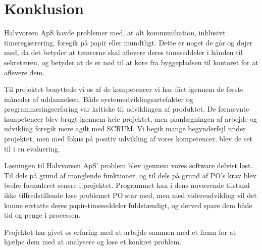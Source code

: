 \section{Konklusion}
Halvvorsen ApS havde problemer med, at alt kommunikation, inklusivt timeregistrering, foregik på papir eller mundtligt. 
Dette er noget de går og døjer med, da det betyder at tømrerne skal aflevere deres timeseddeler i hånden til sekretæren, og betyder at de er nød til at køre fra byggepladsen til kontoret for at aflevere dem.

Til projektet benyttede vi os af de kompetencer vi har fået igennem de første måneder af uddannelsen.
Både systemudviklingsartefakter og programmeringserfaring var kritiske til udviklingen af produktet. 
De førnævnte kompetencer blev brugt igennem hele projektet, men planlægningen af arbejde og udvikling foregik mere agilt med SCRUM.
Vi begik mange begynderfejl under projektet, men med fokus på positiv udvikling af vores kompetencer, blev de set til i en evaluering.
 
Løsningen til Halvvorsen ApS' problem blev igennem vores software delvist løst. 
Til dels på grund af manglende funktioner, og til dels på grund af PO's krav blev bedre formuleret senere i projektet.
Programmet kan i dens nuværende tilstand ikke tilfredstillende løse problemet PO står med, men med videreudvikling vil det kunne erstatte deres papir-timeseddeler fuldstændigt, og derved spare dem både tid og penge i processen.

Projektet har givet os erfaring med at arbejde sammen med et firma for at hjælpe dem med at analysere og løse et konkret problem.